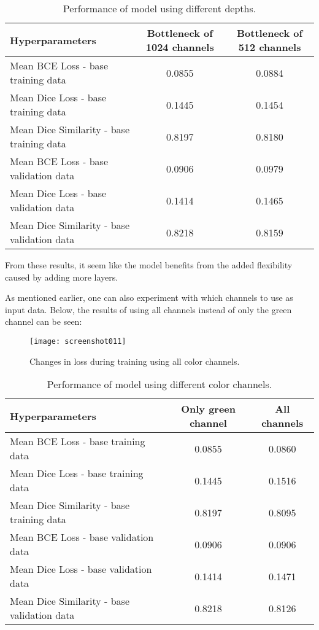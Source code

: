 \documentclass[a4paper, 12pt]{article}
\begin{document}
\begin{table}[H]
	\centering
	\begin{tabular}{|l||c|c|}
		\hline
		Hyperparameters & Bottleneck of 1024 channels & Bottleneck of 512 channels\\
		\hline\hline
		Mean BCE Loss - base training data & 0.0855 & 0.0884\\
		\hline
		Mean Dice Loss - base training data & 0.1445 & 0.1454\\
		\hline
		Mean Dice Similarity - base training data & 0.8197 & 0.8180\\
		\hline\hline
		Mean BCE Loss - base validation data & 0.0906 & 0.0979\\
		\hline
		Mean Dice Loss - base validation data & 0.1414 & 0.1465\\
		\hline
		Mean Dice Similarity - base validation data & 0.8218 & 0.8159\\
		\hline
	\end{tabular}
	\caption{Performance of model using different depths.}
	\label{table4}
\end{table}

From these results, it seem like the model benefits from the added flexibility caused by adding more layers.

As mentioned earlier, one can also experiment with which channels to use as input data. Below, the results of using all channels instead of only the green channel can be seen:

\begin{figure}[H]
	\centering
	\texttt{[image: screenshot011]}
	\caption{Changes in loss during training using all color channels.}
	\label{fig:screenshot011}
\end{figure}

\begin{table}[H]
	\centering
	\begin{tabular}{|l||c|c|}
		\hline
		Hyperparameters & Only green channel & All channels\\
		\hline\hline
		Mean BCE Loss - base training data & 0.0855 & 0.0860\\
		\hline
		Mean Dice Loss - base training data & 0.1445 & 0.1516\\
		\hline
		Mean Dice Similarity - base training data & 0.8197 & 0.8095\\
		\hline\hline
		Mean BCE Loss - base validation data & 0.0906 & 0.0906\\
		\hline
		Mean Dice Loss - base validation data & 0.1414 & 0.1471\\
		\hline
		Mean Dice Similarity - base validation data & 0.8218 & 0.8126\\
		\hline
	\end{tabular}
	\caption{Performance of model using different color channels.}
	\label{table5}
\end{table}
\end{document}
